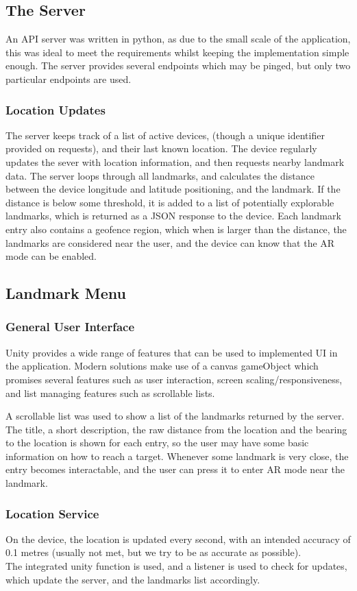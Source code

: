 
\subsection{The Server}
An API server was written in python, as due to the small scale of the application, this was ideal to meet the requirements whilst keeping the 
implementation simple enough. The server provides several endpoints which may be pinged, but only two particular endpoints are used. 
\subsubsection{Location Updates}
The server keeps track of a list of active devices, (though a unique identifier provided on requests), and their last known location.
The device regularly updates the sever with location information, and then requests nearby landmark data. 
The server loops through all landmarks, and calculates the distance between the device longitude and latitude positioning, and the landmark.
If the distance is below some threshold, it is added to a list of potentially explorable landmarks, which is returned as a JSON response 
to the device. Each landmark entry also contains a geofence region, which when is larger than the distance, the landmarks are considered near 
the user, and the device can know that the AR mode can be enabled.


\subsection{Landmark Menu}
\subsubsection{General User Interface}
Unity provides a wide range of features that can be used to implemented UI in the application. 
Modern solutions make use of a canvas gameObject which promises several features such as user interaction, screen scaling/responsiveness, and 
list managing features such as scrollable lists.

A scrollable list was used to show a list of the landmarks returned by the server. The title,
a short description, the raw distance from the location and the bearing to the location is shown for each entry,
 so the user may have some basic information on how to reach a target.
  Whenever some landmark is very close, the entry becomes interactable, and the user can press it 
to enter AR mode near the landmark. 

\subsubsection{Location Service}
On the device, the location is updated every second, with an intended accuracy of 0.1 metres 
(usually not met, but we try to be as accurate as possible).\\
The integrated unity function is used, and a listener is used to check for updates, which update the server,
and the landmarks list accordingly.


